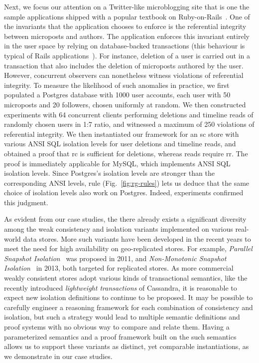 Next, we focus our attention on a Twitter-like microblogging site that
is one the sample applications shipped with a popular textbook on
Ruby-on-Rails~\cite{railsbook}. One of the invariants that the
application chooses to enforce is the referential integrity between
microposts and authors. The application enforces this invariant
entirely in the user space by relying on database-backed transactions
(this behaviour is typical of Rails applications~\cite{bailisferal}).
For instance, deletion of a user is carried out in a transaction that
also includes the deletion of microposts authored by the user.
However, concurrent observers can nonetheless witness violations of
referential integrity. To measure the likelihood of such anomalies in
practice, we first populated a Postgres database with 1000 user
accounts, each user with 50 microposts and 20 followers, chosen
uniformly at random. We then constructed experiments with 64
concurrent clients performing deletions and timeline reads of randomly
chosen users in 1:7 ratio, and witnessed a maximum of 250 violations
of referential integrity. We then instantiated our framework for an
{\sc sc} store with various ANSI SQL isolation levels for user
deletions and timeline reads, and obtained a proof that {\sc rc} is
sufficient for deletions, whereas reads require {\sc rr}. The proof is
immediately applicable for MySQL, which implements ANSI SQL isolation
levels. Since Postgres's isolation levels are stronger than the
corresponding ANSI levels,  rule
(Fig.~\ref{fig:rg-rules}) lets us deduce that the same choice of
isolation levels also work on Postgres. Indeed, experiments confirmed
this judgment.

As evident from our case studies, the there already exists a
significant diversity among the weak consistency and isolation
variants implemented on various real-world data stores. More such
variants have been developed in the recent years to meet the need for
high availability on geo-replicated stores. For example,
\emph{Parallel Snapshot Isolation}~\cite{psi} was proposed in 2011,
and \emph{Non-Monotonic Snapshot Isolation}~\cite{nmsi} in 2013, both
targeted for replicated stores. As more commercial weakly consistent
stores adopt various kinds of transactional semantics, like the
recently introduced \emph{lightweight transactions} of Cassandra, it
is reasonable to expect new isolation definitions to continue to be
proposed. It may be possible to carefully engineer a reasoning
framework for each combination of consistency and isolation, but such
a strategy would lead to multiple semantic definitions and proof
systems with no obvious way to compare and relate them. Having a
parameterized semantics and a proof framework built on the such
semantics allows us to support these variants as distinct, yet
comparable instantiations, as we demonstrate in our case studies.




